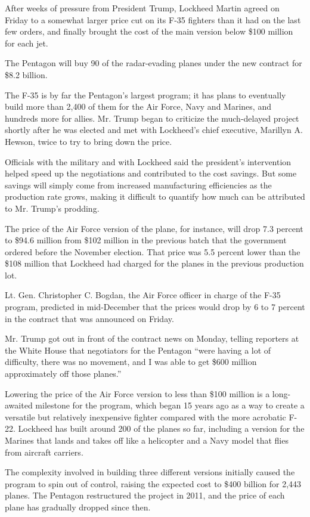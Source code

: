 After weeks of pressure from President Trump, Lockheed Martin agreed on
Friday to a somewhat larger price cut on its F-35 fighters than it had
on the last few orders, and finally brought the cost of the main version
below \$100 million for each jet.

The Pentagon will buy 90 of the radar-evading planes under the new
contract for \$8.2 billion.

The F-35 is by far the Pentagon's largest program; it has plans to
eventually build more than 2,400 of them for the Air Force, Navy and
Marines, and hundreds more for allies. Mr. Trump began to criticize the
much-delayed project shortly after he was elected and met with
Lockheed's chief executive, Marillyn A. Hewson, twice to try to bring
down the price.

Officials with the military and with Lockheed said the president's
intervention helped speed up the negotiations and contributed to the
cost savings. But some savings will simply come from increased
manufacturing efficiencies as the production rate grows, making it
difficult to quantify how much can be attributed to Mr. Trump's
prodding.

The price of the Air Force version of the plane, for instance, will drop
7.3 percent to \$94.6 million from \$102 million in the previous batch
that the government ordered before the November election. That price was
5.5 percent lower than the \$108 million that Lockheed had charged for
the planes in the previous production lot.

Lt. Gen. Christopher C. Bogdan, the Air Force officer in charge of the
F-35 program, predicted in mid-December that the prices would drop by 6
to 7 percent in the contract that was announced on Friday.

Mr. Trump got out in front of the contract news on Monday, telling
reporters at the White House that negotiators for the Pentagon ``were
having a lot of difficulty, there was no movement, and I was able to get
\$600 million approximately off those planes.''

Lowering the price of the Air Force version to less than \$100 million
is a long-awaited milestone for the program, which began 15 years ago as
a way to create a versatile but relatively inexpensive fighter compared
with the more acrobatic F-22. Lockheed has built around 200 of the
planes so far, including a version for the Marines that lands and takes
off like a helicopter and a Navy model that flies from aircraft
carriers.

The complexity involved in building three different versions initially
caused the program to spin out of control, raising the expected cost to
\$400 billion for 2,443 planes. The Pentagon restructured the project in
2011, and the price of each plane has gradually dropped since then.

